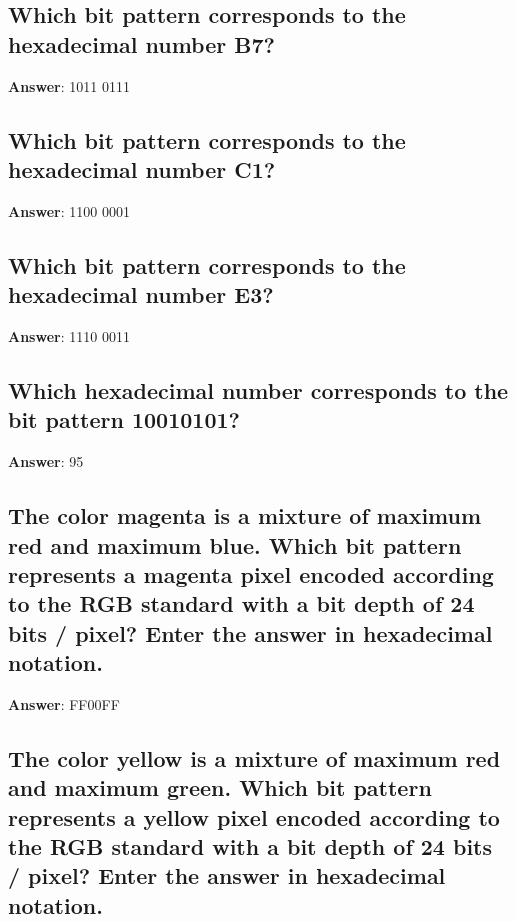 \documentclass[a4paper,11pt,oneside]{article}
\begin{document}
\begin{sloppypar}
\subsection{Which bit pattern corresponds to the hexadecimal number B7?}

\label{q:421:sa:en:True}

\textbf{Answer}: 1011 0111



\subsection{Which bit pattern corresponds to the hexadecimal number C1?}

\label{q:422:sa:en:True}

\textbf{Answer}: 1100 0001



\subsection{Which bit pattern corresponds to the hexadecimal number E3?}

\label{q:423:sa:en:True}

\textbf{Answer}: 1110 0011



\subsection{Which hexadecimal number corresponds to the bit pattern 10010101?}

\label{q:424:sa:en:True}

\textbf{Answer}: 95



\subsection{The color magenta is a mixture of maximum red and maximum blue. Which bit pattern represents a magenta pixel encoded according to the RGB standard with a bit depth of 24 bits / pixel? Enter the answer in hexadecimal notation.}

\label{q:425:sa:en:True}

\textbf{Answer}: FF00FF



\subsection{The color yellow is a mixture of maximum red and maximum green. Which bit pattern represents a yellow pixel encoded according to the RGB standard with a bit depth of 24 bits / pixel? Enter the answer in hexadecimal notation.}


\end{sloppypar}
\end{document}
